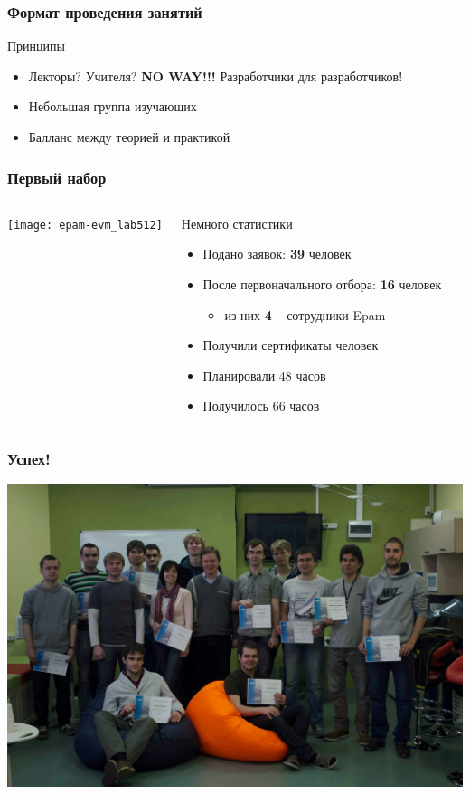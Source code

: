 \begin{frame}
	\frametitle{Формат проведения занятий}

	\begin{block}{Принципы}
		\begin{itemize}
			\item Лекторы? Учителя? {\bf NO WAY!!!} \newline 
				Разработчики для разработчиков! 
			\item Небольшая группа изучающих
			\item Балланс между теорией и практикой
		\end{itemize}
	\end{block}

\end{frame}

\begin{frame}
  \frametitle{Первый набор}
  \begin{columns}
	\texttt{[image: epam-evm\_lab512]}

	\begin{block}{Немного статистики}
		\begin{itemize}
			\item Подано заявок: {\bf 39} человек
			\item После первоначального отбора: {\bf 16} человек
				\begin{itemize}
					\item из них {\bf 4} -- сотрудники Epam
				\end{itemize}
            \item Получили сертификаты человек
            \item Планировали 48 часов
            \pause
            \item Получилось 66 часов
		\end{itemize}
	\end{block}
  \end{columns}

    
\end{frame}

\begin{frame}
  \frametitle{Успех!}
  \includegraphics[width=\textwidth]{linux_courses_certificates1.jpg}
\end{frame}

